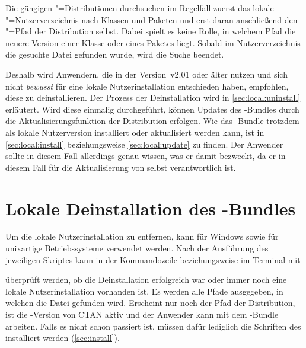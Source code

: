 Die gängigen "=Distributionen durchsuchen im Regelfall zuerst das 
lokale "=Nutzerverzeichnis nach Klassen und Paketen und erst daran 
anschließend den "=Pfad der Distribution selbst. Dabei spielt es 
keine Rolle, in welchem Pfad die neuere Version einer Klasse oder eines Paketes 
liegt. Sobald im Nutzerverzeichnis die gesuchte Datei gefunden wurde, wird die 
Suche beendet.

Deshalb wird Anwendern, die \TUDScript in der Version~v2.01 oder älter nutzen 
und sich nicht \emph{bewusst} für eine lokale Nutzerinstallation entschieden 
haben, empfohlen, diese zu deinstallieren. Der Prozess der Deinstallation wird 
in \autoref{sec:local:uninstall} erläutert. Wird diese einmalig durchgeführt, 
können Updates des \TUDScript-Bundles durch die Aktualisierungsfunktion der 
Distribution erfolgen. Wie das \TUDScript-Bundle trotzdem als lokale 
Nutzerversion installiert oder aktualisiert werden kann, ist in 
\autoref{sec:local:install} beziehungsweise \autoref{sec:local:update} zu 
finden. Der Anwender sollte in diesem Fall allerdings genau wissen, was er 
damit bezweckt, da er in diesem Fall für die Aktualisierung von \TUDScript 
selbst verantwortlich ist.



\section{Lokale Deinstallation des \TUDScript-Bundles}
%
%
%
Um die lokale Nutzerinstallation zu entfernen, kann für Windows
sowie für unixartige Betriebssysteme
verwendet werden. Nach der Ausführung des jeweiligen Skriptes kann in der 
Kommandozeile beziehungsweise im Terminal mit
%
\begin{quoting}
\end{quoting}
%
überprüft werden, ob die Deinstallation erfolgreich war oder immer noch eine 
lokale Nutzerinstallation vorhanden ist. Es werden alle Pfade ausgegeben, in 
welchen die Datei  gefunden wird. Erscheint nur noch der 
Pfad der Distribution, ist die \TUDScript-Version von CTAN aktiv und der 
Anwender kann mit dem \TUDScript-Bundle arbeiten. Falls es nicht 
schon passiert ist, müssen dafür lediglich die Schriften des \CDs installiert 
werden (\autoref{sec:install}).

